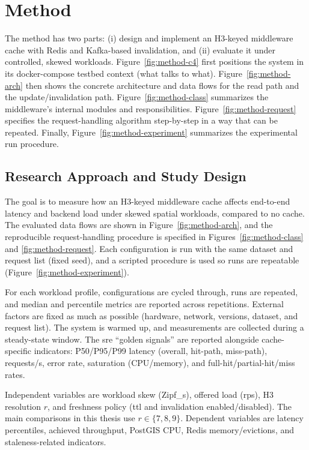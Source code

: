 \newlength{\figmaxheight}
\setlength{\figmaxheight}{%
  \dimexpr\textheight-\abovecaptionskip-\belowcaptionskip-6\baselineskip\relax
}

\section{Method}

The method has two parts: (i) design and implement an H3-keyed middleware cache with Redis and Kafka-based invalidation, and (ii) evaluate it under controlled, skewed workloads. Figure~\ref{fig:method-c4} first positions the system in its docker-compose testbed context (what talks to what). Figure~\ref{fig:method-arch} then shows the concrete architecture and data flows for the read path and the update/invalidation path. Figure~\ref{fig:method-class} summarizes the middleware’s internal modules and responsibilities. Figure~\ref{fig:method-request} specifies the request-handling algorithm step-by-step in a way that can be repeated. Finally, Figure~\ref{fig:method-experiment} summarizes the experimental run procedure.

\subsection{Research Approach and Study Design}
The goal is to measure how an H3-keyed middleware cache affects end-to-end latency and backend load under skewed spatial workloads, compared to no cache. The evaluated data flows are shown in Figure~\ref{fig:method-arch}, and the reproducible request-handling procedure is specified in Figures~\ref{fig:method-class} and \ref{fig:method-request}. Each configuration is run with the same dataset and request list (fixed seed), and a scripted procedure is used so runs are repeatable (Figure~\ref{fig:method-experiment}).

For each workload profile, configurations are cycled through, runs are repeated, and median and percentile metrics are reported across repetitions. External factors are fixed as much as possible (hardware, network, versions, dataset, and request list). The system is warmed up, and measurements are collected during a steady-state window. The \ac{sre} “golden signals” are reported alongside cache-specific indicators: P50/P95/P99 latency (overall, hit-path, miss-path), requests/s, error rate, saturation (CPU/memory), and full-hit/partial-hit/miss rates.

Independent variables are workload skew (Zipf\_s), offered load (\ac{rps}), H3 resolution $r$, and freshness policy (\ac{ttl} and invalidation enabled/disabled). The main comparisons in this thesis use $r\in\{7,8,9\}$. Dependent variables are latency percentiles, achieved throughput, PostGIS CPU, Redis memory/evictions, and staleness-related indicators.

